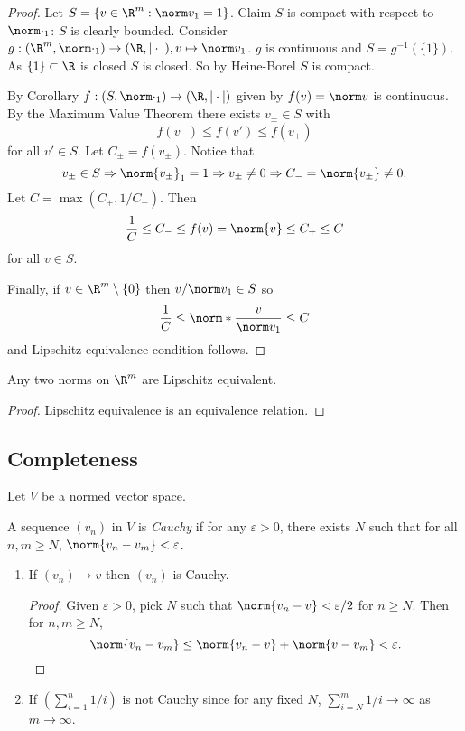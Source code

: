 \documentclass[a4paper]{article}
\theoremstyle{definition}
\begin{document}
\begin{proof}
  Let \(S = \{v\in \R^m: \norm v_1 = 1 \}\). Claim \(S\) is compact with respect to \(\norm \cdot_1\): \(S\) is clearly bounded. Consider \(g:(\R^m, \norm \cdot_1) \to (\R, |\cdot|), v\mapsto \norm v_1\). \(g\) is continuous and \(S = g^{-1}(\{1\})\). As \(\{1\} \subset \R\) is closed \(S\) is closed. So by Heine-Borel \(S\) is compact.

  By Corollary \(f:(S, \norm \cdot_1) \to (\R, |\cdot|)\) given by \(f(v) = \norm v\) is continuous. By the Maximum Value Theorem there exists \(v_\pm\in S\) with
  \[
    f(v_-) \leq f(v') \leq f(v_+)
  \]
  for all \(v' \in S\). Let \(C_\pm = f(v_\pm)\). Notice that
  \[
    v_\pm\in S \Rightarrow \norm{v_\pm}_1 = 1 \Rightarrow v_\pm \neq0 \Rightarrow C_-=\norm{v_\pm} \neq 0.
  \]
  Let \(C = \max(C_+,1/C_-)\). Then
  \[
    \frac{1}{C} \leq C_- \leq f(v) = \norm{v} \leq C_+ \leq C
  \]
  for all \(v \in S\).

  Finally, if \(v \in \R^m\setminus\{0\}\) then \(v/\norm v_1 \in S\) so
  \[
    \frac{1}{C} \leq \norm*{\frac{v}{\norm v_1}} \leq C
  \]
  and Lipschitz equivalence condition follows.
\end{proof}

\begin{corollary}
  Any two norms on \(\R^m\) are Lipschitz equivalent.
\end{corollary}

\begin{proof}
  Lipschitz equivalence is an equivalence relation.
\end{proof}

\subsection{Completeness}

Let \(V\) be a normed vector space.

\begin{definition}
  A sequence \((v_n)\) in \(V\) is \emph{Cauchy} if for any \(\varepsilon>0\), there exists \(N\) such that for all \(n,m\geq N\), \(\norm{v_n-v_m} < \varepsilon\).
\end{definition}

\begin{eg}\leavevmode
  \begin{enumerate}
  \item If \((v_n)\to v\) then \((v_n)\) is Cauchy.
    \begin{proof}
      Given \(\varepsilon>0\), pick \(N\) such that \(\norm{v_n-v} < \varepsilon/2\) for \(n\geq N\). Then for \(n,m \geq N\),
      \[
        \norm{v_n-v_m} \leq \norm{v_n-v}+ \norm{v-v_m} < \varepsilon.
      \]
    \end{proof}
  \item If \((\sum_{i=1}^{n}1/i )\) is not Cauchy since for any fixed \(N\), \(\sum_{i=N}^{m}1/i \to \infty \) as \(m\to \infty\).
  \end{enumerate}
\end{eg}
\end{document}
